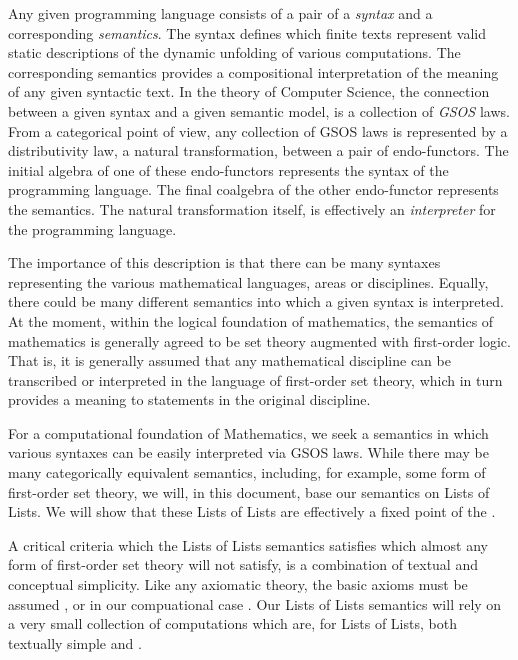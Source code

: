 Any given programming language consists of a pair of a \emph{syntax} and a 
corresponding \emph{semantics}. The syntax defines which finite texts 
represent valid static descriptions of the dynamic unfolding of various 
computations. The corresponding semantics provides a compositional 
interpretation of the meaning of any given syntactic text. In the theory 
of Computer Science, the connection between a given syntax and a given 
semantic model, is a collection of \emph{GSOS} laws. From a categorical 
point of view, any collection of GSOS laws is represented by a 
distributivity law, a natural transformation, between a pair of 
endo-functors. The initial algebra of one of these endo-functors 
represents the syntax of the programming language. The final coalgebra of 
the other endo-functor represents the semantics. The natural 
transformation itself, is effectively an \emph{interpreter} for the 
programming language. 

The importance of this description is that there can be many syntaxes 
representing the various mathematical languages, areas or disciplines. 
Equally, there could be many different semantics into which a given syntax 
is interpreted. At the moment, within the logical foundation of 
mathematics, the semantics of mathematics is generally agreed to be set 
theory augmented with first-order logic. That is, it is generally assumed 
that any mathematical discipline can be transcribed or interpreted in the 
language of first-order set theory, which in turn provides a 
 meaning to statements in the original discipline. 

For a computational foundation of Mathematics, we seek a semantics in 
which various syntaxes can be easily interpreted via GSOS laws. While 
there may be many categorically equivalent semantics, including, for 
example, some form of first-order set theory, we will, in this document, 
base our semantics on Lists of Lists. We will show that these Lists of 
Lists are effectively a fixed point of the .

A critical criteria which the Lists of Lists semantics satisfies which 
almost any form of first-order set theory will not satisfy, is a 
combination of textual and conceptual simplicity. Like any axiomatic 
theory, the basic axioms must be assumed , or in our 
compuational case . Our Lists of Lists 
semantics will rely on a very small collection of computations which are, 
for Lists of Lists, both textually simple and . 

